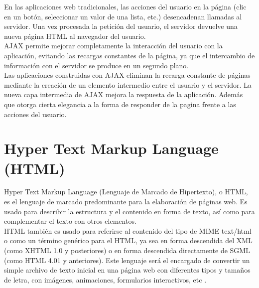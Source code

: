 En las aplicaciones web tradicionales, las acciones del usuario en la p\'agina (clic en un bot\'on, seleccionar un valor de una lista, etc.) desencadenan llamadas al servidor. Una vez procesada la petici\'on del usuario, el servidor devuelve una nueva p\'agina HTML al navegador del usuario.\\
AJAX permite mejorar completamente la interacci\'on del usuario con la aplicaci\'on, evitando las recargas constantes de la p\'agina, ya que el intercambio de informaci\'on con el servidor se produce en un segundo plano.\\
Las aplicaciones construidas con AJAX eliminan la recarga constante de p\'aginas mediante la creaci\'on de un elemento intermedio entre el usuario y el servidor. La nueva capa intermedia de AJAX mejora la respuesta de la aplicaci\'on. Adem\'as que otorga cierta elegancia a la forma de responder de la pagina frente a las acciones del usuario.

\section{Hyper Text Markup Language (HTML)}
Hyper Text Markup Language (Lenguaje de Marcado de Hipertexto), o HTML, es el lenguaje de marcado predominante para la elaboraci\'on de p\'aginas web. Es usado para describir la estructura y el contenido en forma de texto, as\'i como para complementar el texto con otros elementos.\\
HTML tambi\'en es usado para referirse al contenido del tipo de MIME text/html o como un t\'ermino gen\'erico para el HTML, ya sea en forma descendida del XML (como XHTML 1.0 y posteriores) o en forma descendida directamente de SGML (como HTML 4.01 y anteriores).
Este lenguaje ser\'a el encargado de convertir un simple archivo de texto inicial en una p\'agina web con diferentes tipos y tama\~nos de letra, con im\'agenes, animaciones, formularios interactivos, etc \cite{html}.

